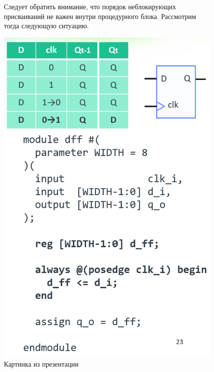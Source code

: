 \documentclass[a4paper,12pt]{article} %
\begin{document}
\begin{figure}[H]
\begin{minipage}[t]{0.55\textwidth}
        Следует обратить внимание, что порядок неблокирующих присваиваний не важен внутри процедурного блока. Рассмотрим тогда следующую ситуацию.
    \end{minipage}%
    \hfill
    \begin{minipage}[t]{0.4\textwidth}
        \vspace{0pt} %
        \centering
        \includegraphics[width=\linewidth]{Learning/comb_logic.png}
        \caption{Картинка из презентации}
    \end{minipage}
\end{figure}
\end{document}
